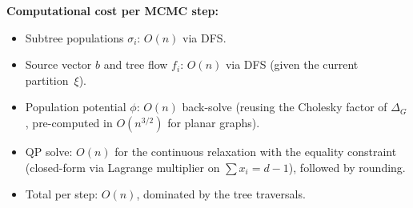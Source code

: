 \documentclass[11pt]{article}
\begin{document}
\medskip\noindent
\textbf{Computational cost per MCMC step:}
\begin{itemize}
  \item Subtree populations $\sigma_i$: $O(n)$ via DFS.
  \item Source vector $b$ and tree flow $f_i$: $O(n)$ via DFS (given the
    current partition~$\xi$).
  \item Population potential $\phi$: $O(n)$ back-solve (reusing the Cholesky
    factor of $\Delta_G$, pre-computed in $O(n^{3/2})$ for planar graphs).
  \item QP solve: $O(n)$ for the continuous relaxation with the equality
    constraint (closed-form via Lagrange multiplier on $\sum x_i = d - 1$),
    followed by rounding.
  \item Total per step: $O(n)$, dominated by the tree traversals.
\end{itemize}
\end{document}
